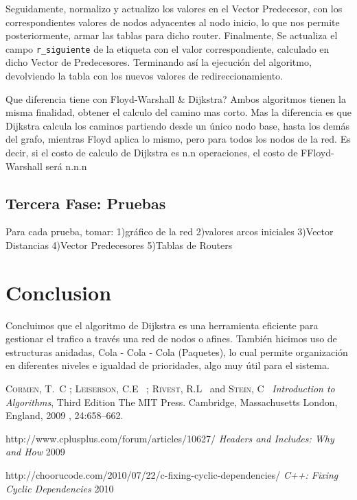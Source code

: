 \documentclass[12pt]{article} %
\begin{document}
Seguidamente, normalizo y actualizo los valores en el Vector Predecesor, con los correspondientes valores de nodos adyacentes al nodo inicio, lo que nos permite posteriormente, armar las tablas para dicho router.
Finalmente, Se actualiza el campo \verb+r_siguiente+ de la etiqueta con el valor correspondiente,  calculado en dicho Vector de Predecesores. Terminando así la ejecución del algoritmo, devolviendo la tabla con los nuevos valores de redireccionamiento.
 
Que diferencia tiene con Floyd-Warshall \& Dijkstra? Ambos algoritmos tienen la misma finalidad, obtener el calculo del camino mas corto. Mas la diferencia es que Dijkstra calcula los caminos partiendo desde un único nodo base, hasta los demás del grafo, mientras Floyd aplica lo mismo, pero para todos los nodos de la red.
Es decir, si el costo de calculo de Dijkstra es n.n operaciones, el costo de FFloyd-Warshall será n.n.n
\subsection{Tercera Fase: Pruebas}
Para cada prueba, tomar: 1)gráfico de la red 2)valores arcos iniciales 3)Vector Distancias
4)Vector Predecesores  5)Tablas de Routers


\section{Conclusion} %
Concluimos que el algoritmo de Dijkstra es una herramienta eficiente para gestionar el trafico a través una red de nodos o afines.
También hicimos uso de estructuras anidadas, Cola - Cola - Cola (Paquetes), lo cual permite organización en diferentes niveles e igualdad de prioridades, algo muy útil para el sistema.


\begin{thebibliography}{99} %

 \textsc{Cormen, T.~C ; Leiserson, C.E~ ; Rivest, R.L~ } and \textsc{Stein, C~}
\textit{Introduction to Algorithms}, Third Edition
The MIT Press. Cambridge, Massachusetts	London, England, 2009
, 24:658--662.

http://www.cplusplus.com/forum/articles/10627/
\textit{Headers and Includes: Why and How} 2009

http://choorucode.com/2010/07/22/c-fixing-cyclic-dependencies/
\textit{C++: Fixing Cyclic Dependencies} 2010

\end{thebibliography}

\end{document}
